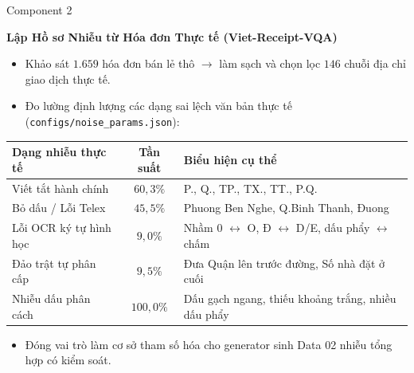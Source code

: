 \documentclass[aspectratio=169,9pt]{beamer}
\begin{document}
\begin{frame}{Component 2}
  \vspace{0.05cm}
  \centerline{\large\textbf{Lập Hồ sơ Nhiễu từ Hóa đơn Thực tế (Viet-Receipt-VQA)}}
  \vspace{0.15cm}

  \begin{itemize}
    \setlength{\itemsep}{2.5pt}
    \item Khảo sát $1.659$ hóa đơn bán lẻ thô $\to$ làm sạch và chọn lọc $146$ chuỗi địa chỉ giao dịch thực tế.
    \item Đo lường định lượng các dạng sai lệch văn bản thực tế (\texttt{configs/noise\_params.json}):
  \end{itemize}

  \vspace{-0.1cm}
  \begin{table}
    \centering\footnotesize
    \begin{tabular}{|l|c|p{7.2cm}|}
      \hline
      \rowcolor{tableheader}
      \textbf{Dạng nhiễu thực tế} & \textbf{Tần suất} & \textbf{Biểu hiện cụ thể} \\
      \hline
      Viết tắt hành chính & $60{,}3\%$ & P., Q., TP., TX., TT., P.Q. \\
      \hline
      Bỏ dấu / Lỗi Telex & $45{,}5\%$ & Phuong Ben Nghe, Q.Binh Thanh, Đuong \\
      \hline
      Lỗi OCR ký tự hình học & $9{,}0\%$ & Nhầm 0 $\leftrightarrow$ O, Đ $\leftrightarrow$ D/E, dấu phẩy $\leftrightarrow$ chấm \\
      \hline
      Đảo trật tự phân cấp & $9{,}5\%$ & Đưa Quận lên trước đường, Số nhà đặt ở cuối \\
      \hline
      Nhiễu dấu phân cách & $100{,}0\%$ & Dấu gạch ngang, thiếu khoảng trắng, nhiều dấu phẩy \\
      \hline
    \end{tabular}
  \end{table}

  \begin{itemize}
    \item Đóng vai trò làm cơ sở tham số hóa cho generator sinh Data 02 nhiễu tổng hợp có kiểm soát.
  \end{itemize}
\end{frame}
\end{document}
